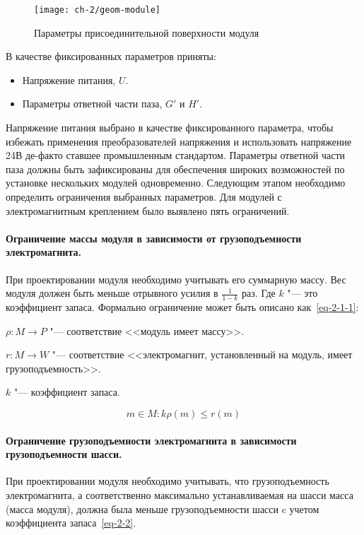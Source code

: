 \begin{figure}[tbh]
	\centering
	\texttt{[image: ch-2/geom-module]}
	\caption{Параметры присоединительной поверхности модуля}
	\label{fig:geom-module}
\end{figure}

В качестве фиксированных параметров приняты:

\begin{itemize}
	\item Напряжение питания, $U$.
	\item Параметры ответной части паза, $G'$ и $H'$.
\end{itemize}

Напряжение питания выбрано в качестве фиксированного параметра, чтобы избежать применения преобразователей напряжения и использовать напряжение 24\:В де-факто ставшее промышленным стандартом. Параметры ответной части паза должны быть зафиксированы для обеспечения  широких возможностей по установке нескольких модулей одновременно. Следующим этапом необходимо определить ограничения выбранных параметров. Для модулей с электромагнитным креплением было выявлено пять ограничений.

\paragraph{Ограничение массы модуля в зависимости от грузоподъемности электромагнита.} При проектировании модуля необходимо учитывать его суммарную массу. Вес модуля должен быть меньше отрывного усилия в $\frac{1}{1-k}$ раз. Где $k$ "--- это коэффициент запаса. Формально ограничение может быть описано как~\cref{eq-2-1-1}:

\noindent $\rho : M \rightarrow P$ "--- соответствие <<модуль имеет массу>>.

\noindent $r : M \rightarrow W$ "--- соответствие <<электромагнит, установленный на модуль, имеет грузоподъемность>>.

\noindent $k$ "--- коэффициент запаса.

\begin{equation}
m \in M: k\rho(m) \leq r(m)
\label{eq-2-1-1}
\end{equation}

\paragraph{Ограничение грузоподъемности электромагнита в зависимости грузоподъемности шасси.} При проектировании модуля необходимо учитывать, что грузоподъемность электромагнита, а соответственно максимально устанавливаемая на шасси масса (масса модуля), должна была меньше грузоподъемности шасси c учетом коэффициента запаса~\cref{eq-2-2}.

